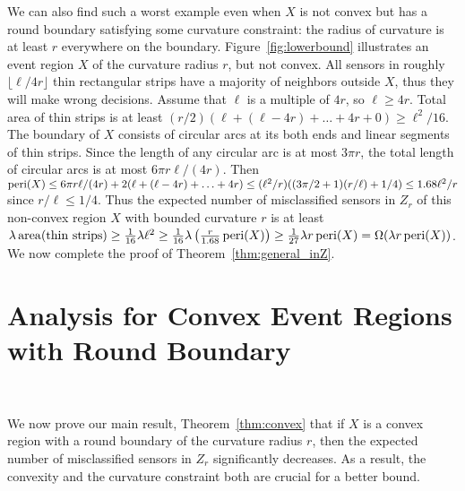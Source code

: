 \documentclass{article}
\def\area{\mathop{\rm area}}
\def\peri{\mathop{\rm peri}}
\begin{document}
\par
We can also find such a worst example even when $X$ is not convex but has a round boundary satisfying some curvature constraint: the radius of curvature is at least $r$ everywhere on the boundary. Figure~\ref{fig:lowerbound} illustrates an event region $X$ of the curvature radius $r$, but not convex. All sensors in roughly $\lfloor \ell/4r \rfloor$ thin rectangular strips have a majority of neighbors outside $X$, thus they will make wrong decisions. Assume that $\ell$ is a multiple of $4r$, so $\ell \geq 4r$. Total area of thin strips is at least $(r/2)(\ell + (\ell-4r) + \ldots + 4r + 0) \geq \ell^2/16$. The boundary of $X$ consists of circular arcs at its both ends and linear segments of thin strips. Since the length of any circular arc is at most $3\pi r$, the total length of circular arcs is at most $6\pi r \ell/(4r)$. Then $\peri(X)\leq 6\pi r \ell/(4r) + 2(\ell + (\ell-4r) + \ldots + 4r)\leq (\ell^2/r)((3\pi/2 + 1)(r/\ell)+1/4) \leq 1.68\ell^2/r$ since $r/\ell \leq 1/4$. Thus the expected number of misclassified sensors in $Z_r$ of this non-convex region $X$ with bounded curvature $r$ is at least $\lambda \area(\mathrm{thin\,\, strips}) \geq \frac{1}{16}\lambda\ell^2 \geq \frac{1}{16}\lambda\left(\frac{r}{1.68}\peri(X)\right)\geq\frac{1}{27}\lambda r \peri(X) = \Omega(\lambda r \peri(X))$. We now complete the proof of Theorem~\ref{thm:general_inZ}.



\section{Analysis for Convex Event Regions with Round Boundary}~\label{sec:convex}

We now prove our main result, Theorem~\ref{thm:convex} that if $X$ is a convex region with a round boundary of the curvature radius $r$, then the expected number of misclassified sensors in $Z_r$ significantly decreases. As a result, the convexity and the curvature constraint both are crucial for a better bound.
\end{document}
